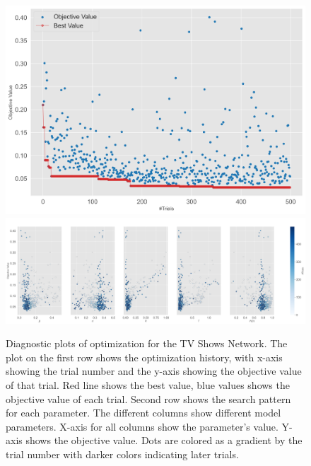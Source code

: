 \documentclass[11pt]{article}
\begin{document}
\begin{figure}[H]
    \centering
    \includegraphics[width=.7\linewidth]{../plots/overall/Optimization_History_tvshows.png}
    \includegraphics[width=.7\linewidth]{../plots/overall/Plot_Slice_tvshows.png}
  \caption{Diagnostic plots of optimization for the TV Shows Network. The plot on the first row shows the optimization history, with x-axis showing the trial number and the y-axis showing the objective value of that trial. Red line shows the best value, blue values shows the objective value of each trial. Second row shows the search pattern for each parameter. The different columns show different model parameters. X-axis for all columns show the parameter's value. Y-axis shows the objective value. Dots are colored as a gradient by the trial number with darker colors indicating later trials.}
  \label{appendix:optimization_tvshows}
\end{figure}
\end{document}
